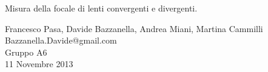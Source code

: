 \begin{center}

     	{\huge Misura della focale di lenti convergenti e divergenti.}
	\vspace{0.5cm}

      	{\large Francesco Pasa, Davide Bazzanella, Andrea Miani, Martina Cammilli} \\
      	{Bazzanella.Davide@gmail.com} \\
		{\large Gruppo A6} \\
	
	\vspace{0.3cm}
      	{\large 11 Novembre 2013}

\end{center}
